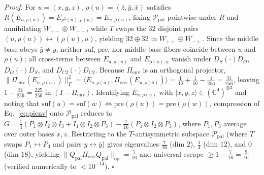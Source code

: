\documentclass[11pt,a4paper]{article}
\newcommand{\Wpp}{W_{++}}
\newcommand{\Wpm}{W_{+-}}
\newcommand{\Wmp}{W_{-+}}
\newcommand{\Wmm}{W_{--}}
\newcommand{\Pienv}{\Pi_{\mathrm{env}}}
\begin{document}
\noindent\textit{Proof.} For $u=(x,y,z)$, $\rho(u)=(\bar{z},\bar{y},\bar{x})$ satisfies $R(E_{u,\rho(u)}) = E_{\rho^2(u),\rho(u)} = E_{u,\rho(u)}$, fixing $\mathcal{P}_{\mathrm{pal}}$ pointwise under $R$ and annihilating $\Wpm\oplus\Wmm$, while $T$ swaps the $32$ disjoint pairs $(u,\rho(u))\leftrightarrow(\rho(u),u)$, yielding $32\oplus 32$ in $\Wpp\oplus\Wmp$. Since the middle base obeys $\bar{y}\neq y$, neither $\mathrm{suf}$, $\mathrm{pre}$, nor middle-base fibers coincide between $u$ and $\rho(u)$; all cross-terms between $E_{u,\rho(u)}$ and $E_{\rho(u),u}$ vanish under $D_S(\cdot)D_O$, $D_O(\cdot)D_S$, and $D_{C2}(\cdot)D_{C2}$. Because $\Pienv$ is an orthogonal projector, $\|\Pienv(E^-_{u,\rho(u)})\|_F^2 = \langle E_{u,\rho(u)}, \Pienv(E_{u,\rho(u)})\rangle = \frac{1}{16} + \frac{1}{16} - \frac{1}{256} = \frac{31}{256}$, leaving $1 - \frac{31}{256} = \frac{225}{256}$ in $(I-\Pienv)$. Identifying $E_{u,\rho(u)}$ with $|x,y,z\rangle\in(\mathbb{C}^4)^{\otimes 3}$ and noting that $\mathrm{suf}(u)=\mathrm{suf}(w)\Leftrightarrow\mathrm{pre}(\rho(u))=\mathrm{pre}(\rho(w))$, compression of Eq.~\eqref{eq:pienv} onto $\mathcal{P}_{\mathrm{pal}}$ reduces to $G = \frac{1}{4}(P_1\otimes I_2\otimes I_3 + I_1\otimes I_2\otimes P_3) - \frac{1}{16}(P_1\otimes I_2\otimes P_3)$, where $P_1,P_3$ average over outer bases $x,z$. Restricting to the $T$-antisymmetric subspace $\mathcal{P}_{\mathrm{pal}}^-$ (where $T$ swaps $P_1\leftrightarrow P_3$ and pairs $y\leftrightarrow\bar{y}$) gives eigenvalues $\frac{7}{16}$ (dim $2$), $\frac{1}{4}$ (dim $12$), and $0$ (dim $18$), yielding $\|Q_{\mathrm{pal}}^-\Pienv Q_{\mathrm{pal}}^-\|_{\mathrm{op}} = \frac{7}{16}$ and universal escape $\ge 1 - \frac{7}{16} = \frac{9}{16}$ (verified numerically to $<10^{-14}$). $\square$
\end{document}
